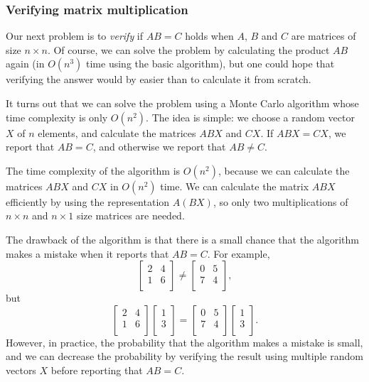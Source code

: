 \subsubsection{Verifying matrix multiplication}


Our next problem is to \emph{verify}
if $AB=C$ holds when $A$, $B$ and $C$
are matrices of size $n \times n$.
Of course, we can solve the problem
by calculating the product $AB$ again
(in $O(n^3)$ time using the basic algorithm),
but one could hope that verifying the
answer would by easier than to calculate it from scratch.

It turns out that we can solve the problem
using a Monte Carlo algorithm whose
time complexity is only $O(n^2)$.
The idea is simple: we choose a random vector
$X$ of $n$ elements, and calculate the matrices
$ABX$ and $CX$. If $ABX=CX$, we report that $AB=C$,
and otherwise we report that $AB \neq C$.

The time complexity of the algorithm is
$O(n^2)$, because we can calculate the matrices
$ABX$ and $CX$ in $O(n^2)$ time.
We can calculate the matrix $ABX$ efficiently
by using the representation $A(BX)$, so only two
multiplications of $n \times n$ and $n \times 1$
size matrices are needed.

The drawback of the algorithm is
that there is a small chance that the algorithm
makes a mistake when it reports that $AB=C$.
For example, 
\[
 \begin{bmatrix}
  2 & 4 \\
  1 & 6 \\
 \end{bmatrix}
\neq
 \begin{bmatrix}
  0 & 5 \\
  7 & 4 \\
 \end{bmatrix},
\]
but
\[
 \begin{bmatrix}
  2 & 4 \\
  1 & 6 \\
 \end{bmatrix}
 \begin{bmatrix}
  1 \\
  3 \\
 \end{bmatrix}
=
 \begin{bmatrix}
  0 & 5 \\
  7 & 4 \\
 \end{bmatrix}
 \begin{bmatrix}
  1 \\
  3 \\
 \end{bmatrix}.
\]
However, in practice, the probability that the
algorithm makes a mistake is small,
and we can decrease the probability by
verifying the result using multiple random vectors $X$
before reporting that $AB=C$.

